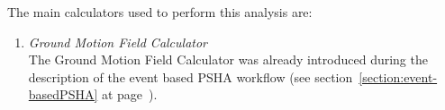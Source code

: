 The main calculators used to perform this analysis are:
\begin{enumerate}
\item \emph{Ground Motion Field Calculator} \hfill \\
The Ground Motion Field Calculator was already 
introduced during the description of the event based PSHA workflow (see 
section~\ref{section:event-basedPSHA} at page~\pageref{section:classicalPSHA}).
\end{enumerate}
\cleardoublepage
